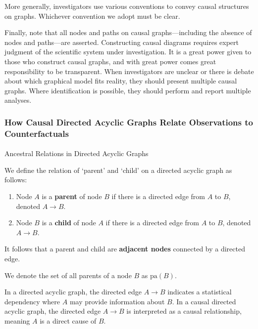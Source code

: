 \documentclass[
  single column]{article}
\makeatletter
\let\oldparagraph\paragraph
\renewcommand{\paragraph}{
    \@ifstar
      \xxxParagraphStar
      \xxxParagraphNoStar
  }
\newcommand{\xxxParagraphStar}[1]{\oldparagraph*{#1}\mbox{}}
\newcommand{\xxxParagraphNoStar}[1]{\oldparagraph{#1}\mbox{}}
\providecommand{\tightlist}{%
  \setlength{\itemsep}{0pt}\setlength{\parskip}{0pt}}\usepackage{longtable,booktabs,array}
\makeatother
\begin{document}
More generally, investigators use various conventions to convey causal
structures on graphs. Whichever convention we adopt must be clear.

Finally, note that all nodes and paths on causal graphs---including the
absence of nodes and paths---are asserted. Constructing causal diagrams
requires expert judgment of the scientific system under investigation.
It is a great power given to those who construct causal graphs, and with
great power comes great responsibility to be transparent. When
investigators are unclear or there is debate about which graphical model
fits reality, they should present multiple causal graphs. Where
identification is possible, they should perform and report multiple
analyses.

\subsubsection{How Causal Directed Acyclic Graphs Relate Observations to
Counterfactuals}\label{how-causal-directed-acyclic-graphs-relate-observations-to-counterfactuals}

\paragraph{Ancestral Relations in Directed Acyclic
Graphs}\label{ancestral-relations-in-directed-acyclic-graphs}

We define the relation of `parent' and `child' on a directed acyclic
graph as follows:

\begin{enumerate}
\def\labelenumi{\arabic{enumi}.}
\tightlist
\item
  Node \(A\) is a \textbf{parent} of node \(B\) if there is a directed
  edge from \(A\) to \(B\), denoted \(A \rightarrow B\).
\item
  Node \(B\) is a \textbf{child} of node \(A\) if there is a directed
  edge from \(A\) to \(B\), denoted \(A \rightarrow B\).
\end{enumerate}

It follows that a parent and child are \textbf{adjacent nodes} connected
by a directed edge.

We denote the set of all parents of a node \(B\) as \(\text{pa}(B)\).

In a directed acyclic graph, the directed edge \(A \rightarrow B\)
indicates a statistical dependency where \(A\) may provide information
about \(B\). In a causal directed acyclic graph, the directed edge
\(A \rightarrow B\) is interpreted as a causal relationship, meaning
\(A\) is a direct cause of \(B\).
\end{document}
